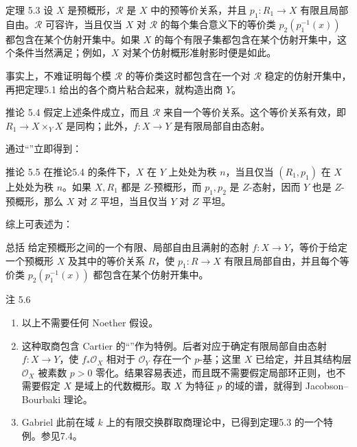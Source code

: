 \begin{statement}{定理 5.3}
设 $X$ 是预概形，$\mathcal R$ 是 $X$ 中的预等价关系，并且 $p_1:R_1\to X$ 有限且局部自由。$\mathcal R$ 可容许，当且仅当 $X$ 对 $\mathcal R$ 的每个集合意义下的等价类 $p_2(p_1^{-1}(x))$ 都包含在某个仿射开集中。如果 $X$ 的每个有限子集都包含在某个仿射开集中，这个条件当然满足；例如，$X$ 对某个仿射概形准射影时便是如此。
\end{statement}

事实上，不难证明每个模 $\mathcal R$ 的等价类这时都包含在一个对 $\mathcal R$ 稳定的仿射开集中，再把定理5.1 给出的各个商片粘合起来，就构造出商 $Y$。

\begin{statement}{推论 5.4}
假定上述条件成立，而且 $\mathcal R$ 来自一个等价关系。这个等价关系有效，即 $R_1\to X\times_YX$ 是同构；此外，$f:X\to Y$ 是有限局部自由态射。
\end{statement}

通过“”立即得到：

\begin{statement}{推论 5.5}
在推论5.4 的条件下，$X$ 在 $Y$ 上处处为秩 $n$，当且仅当 $(R_1,p_1)$ 在 $X$ 上处处为秩 $n$。如果 $X,R_1$ 都是 $Z$-预概形，而 $p_1,p_2$ 是 $Z$-态射，因而 $Y$ 也是 $Z$-预概形，那么 $X$ 对 $Z$ 平坦，当且仅当 $Y$ 对 $Z$ 平坦。
\end{statement}

综上可表述为：
\begin{statement}{总括}
给定预概形之间的一个有限、局部自由且满射的态射 $f:X\to Y$，等价于给定一个预概形 $X$ 及其中的等价关系 $R$，使 $p_1:R\to X$ 有限且局部自由，并且每个等价类 $p_2(p_1^{-1}(x))$ 都包含在某个仿射开集中。
\end{statement}

\begin{statement}{注 5.6}
\begin{enumerate}[label=\arabic*\textsuperscript{o}]
 \item 以上不需要任何 Noether 假设。
 \item 这种取商包含 Cartier 的“”作为特例。后者对应于确定有限局部自由态射 $f:X\to Y$，使 $f_*\mathcal O_X$ 相对于 $\mathcal O_Y$ 存在一个 $p$-基；这里 $X$ 已给定，并且其结构层 $\mathcal O_X$ 被素数 $p>0$ 零化。结果容易表述，而且既不需要假定局部环正则，也不需要假定 $X$ 是域上的代数概形。取 $X$ 为特征 $p$ 的域的谱，就得到 Jacobson--Bourbaki 理论。
 \item Gabriel 此前在域 $k$ 上的有限交换群取商理论中，已得到定理5.3 的一个特例。参见7.4。
\end{enumerate}
\end{statement}

